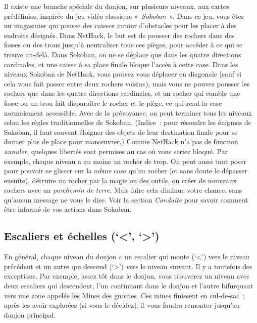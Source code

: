\documentclass[titlepage]{article}
\begin{document}
Il existe une branche spéciale du donjon, sur plusieurs niveaux, aux
cartes prédéfinies, inspirée du jeu vidéo classique «~\textit{Sokoban}~».
Dans ce jeu, vous êtes un magasinier qui pousse des caisses autour
d'obstacles pour les placer à des endroits désignés.
Dans NetHack, le but est de pousser des rochers dans des fosses ou des
trous jusqu'à neutraliser tous ces pièges, pour accéder à ce qui se trouve
au-delà.
Dans Sokoban, on ne se déplace que dans les quatre directions cardinales,
et une caisse à sa place finale bloque l'accès à cette case.
Dans les niveaux Sokoban de NetHack, vous pouvez vous déplacer en diagonale
(sauf si cela vous fait passer entre deux rochers voisins), mais vous ne
pouvez pousser les rochers que dans les quatre directions cardinales, et un
rocher qui comble une fosse ou un trou fait disparaître le rocher et le
piège, ce qui rend la case normalement accessible.
Avec de la prévoyance, on peut terminer tous les niveaux selon les règles
traditionnelles de Sokoban.
(Indice~: pour résoudre les énigmes de Sokoban, il faut souvent éloigner
des objets de leur destination finale pour se donner plus de place pour
manœuvrer.)
Comme NetHack n'a pas de fonction \textit{annuler}, quelques libertés sont
permises au cas où vous seriez bloqué.
Par exemple, chaque niveau a au moins un rocher de trop.
On peut aussi tout poser pour pouvoir se glisser sur la même case qu'un
rocher (et sans doute le dépasser ensuite), détruire un rocher par la
magie ou des outils, ou créer de nouveaux rochers avec un \textit{parchemin de
terre}.
Mais faire cela diminue votre chance, sans qu'aucun message ne vous le
dise.
Voir la section \textit{Conduite} pour savoir comment être informé de vos
actions dans Sokoban.

\subsection{Escaliers et échelles (`\textless{}', `\textgreater{}')}



En général, chaque niveau du donjon a un escalier qui monte (`\textless{}')
vers le niveau précédent et un autre qui descend (`\textgreater{}') vers le
niveau suivant.
Il y a toutefois des exceptions.
Par exemple, assez tôt dans le donjon, vous trouverez un niveau avec deux
escaliers qui descendent, l'un continuant dans le donjon et l'autre
bifurquant vers une zone appelée les Mines des gnomes.
Ces mines finissent en cul-de-sac~; après les avoir explorées (si vous le
décidez), il vous faudra remonter jusqu'au donjon principal.
\end{document}

